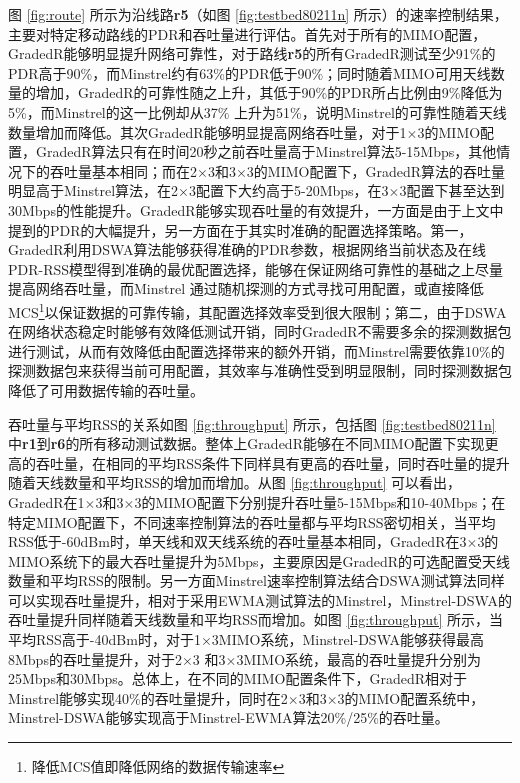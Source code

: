 图 \ref{fig:route} 所示为沿线路\textbf{r5}（如图 \ref{fig:testbed80211n} 所示）的速率控制结果，主要对特定移动路线的PDR和吞吐量进行评估。首先对于所有的MIMO配置，GradedR能够明显提升网络可靠性，对于路线\textbf{r5}的所有GradedR测试至少91\%的PDR高于90\%，而Minstrel约有63\%的PDR低于90\%；同时随着MIMO可用天线数量的增加，GradedR的可靠性随之上升，其低于90\%的PDR所占比例由9\%降低为5\%，而Minstrel的这一比例却从37\% 上升为51\%，说明Minstrel的可靠性随着天线数量增加而降低。其次GradedR能够明显提高网络吞吐量，对于1$\times$3的MIMO配置，GradedR算法只有在时间20秒之前吞吐量高于Minstrel算法5-15Mbps，其他情况下的吞吐量基本相同；而在2$\times$3和3$\times$3的MIMO配置下，GradedR算法的吞吐量明显高于Minstrel算法，在2$\times$3配置下大约高于5-20Mbps，在3$\times$3配置下甚至达到30Mbps的性能提升。GradedR能够实现吞吐量的有效提升，一方面是由于上文中提到的PDR的大幅提升，另一方面在于其实时准确的配置选择策略。第一，GradedR利用DSWA算法能够获得准确的PDR参数，根据网络当前状态及在线PDR-RSS模型得到准确的最优配置选择，能够在保证网络可靠性的基础之上尽量提高网络吞吐量，而Minstrel 通过随机探测的方式寻找可用配置，或直接降低MCS\footnote{降低MCS值即降低网络的数据传输速率}以保证数据的可靠传输，其配置选择效率受到很大限制；第二，由于DSWA在网络状态稳定时能够有效降低测试开销，同时GradedR不需要多余的探测数据包进行测试，从而有效降低由配置选择带来的额外开销，而Minstrel需要依靠10\%的探测数据包来获得当前可用配置，其效率与准确性受到明显限制，同时探测数据包降低了可用数据传输的吞吐量。

吞吐量与平均RSS的关系如图 \ref{fig:throughput} 所示，包括图 \ref{fig:testbed80211n} 中\textbf{r1}到\textbf{r6}的所有移动测试数据。整体上GradedR能够在不同MIMO配置下实现更高的吞吐量，在相同的平均RSS条件下同样具有更高的吞吐量，同时吞吐量的提升随着天线数量和平均RSS的增加而增加。从图 \ref{fig:throughput} 可以看出，GradedR在1$\times$3和3$\times$3的MIMO配置下分别提升吞吐量5-15Mbps和10-40Mbps；在特定MIMO配置下，不同速率控制算法的吞吐量都与平均RSS密切相关，当平均RSS低于-60dBm时，单天线和双天线系统的吞吐量基本相同，GradedR在3$\times$3的MIMO系统下的最大吞吐量提升为5Mbps，主要原因是GradedR的可选配置受天线数量和平均RSS的限制。另一方面Minstrel速率控制算法结合DSWA测试算法同样可以实现吞吐量提升，相对于采用EWMA测试算法的Minstrel，Minstrel-DSWA的吞吐量提升同样随着天线数量和平均RSS而增加。如图 \ref{fig:throughput} 所示，当平均RSS高于-40dBm时，对于1$\times$3MIMO系统，Minstrel-DSWA能够获得最高8Mbps的吞吐量提升，对于2$\times$3 和3$\times$3MIMO系统，最高的吞吐量提升分别为25Mbps和30Mbps。总体上，在不同的MIMO配置条件下，GradedR相对于Minstrel能够实现40\%的吞吐量提升，同时在2$\times$3和3$\times$3的MIMO配置系统中，Minstrel-DSWA能够实现高于Minstrel-EWMA算法20\%/25\%的吞吐量。


